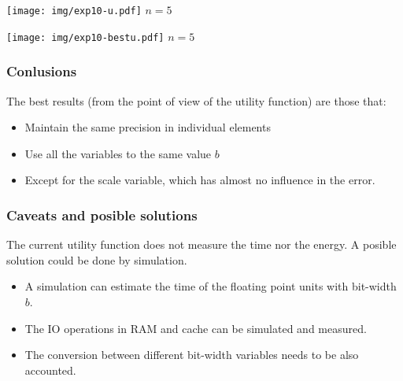 \documentclass[serif, 12pt]{beamer}
\begin{document}

\begin{frame}

\centering
\texttt{[image: img/exp10-u.pdf]}
$n=5$

\end{frame}

\begin{frame}

\centering
\texttt{[image: img/exp10-bestu.pdf]}
$n=5$

\end{frame}


\begin{frame}
\frametitle{Conlusions}

The best results (from the point of view of the utility function) are those 
that:
\begin{itemize}
\item Maintain the same precision in individual elements
\item Use all the variables to the same value $b$
\item Except for the scale variable, which has almost no influence in the error.
\end{itemize}

\end{frame}

\begin{frame}
\frametitle{Caveats and posible solutions}

The current utility function does not measure the time nor the energy. A posible 
solution could be done by simulation.

\begin{itemize}
\item A simulation can estimate the time of the floating point units with 
bit-width $b$.
\item The IO operations in RAM and cache can be simulated and measured.
\item The conversion between different bit-width variables needs to be also 
accounted.
\end{itemize}

\end{frame}
\end{document}
